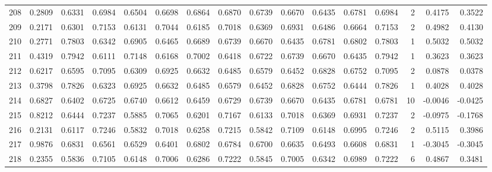 \begin{tabular}{lrrrrrrrrrrrrrrr}
208 &      0.2809 &  0.6331 &  0.6984 &  0.6504 &  0.6698 &  0.6864 &  0.6870 &  0.6739 &  0.6670 &  0.6435 &   0.6781 &     0.6984 &      2 &                    0.4175 &                     0.3522 \\
209 &      0.2171 &  0.6301 &  0.7153 &  0.6131 &  0.7044 &  0.6185 &  0.7018 &  0.6369 &  0.6931 &  0.6486 &   0.6664 &     0.7153 &      2 &                    0.4982 &                     0.4130 \\
210 &      0.2771 &  0.7803 &  0.6342 &  0.6905 &  0.6465 &  0.6689 &  0.6739 &  0.6670 &  0.6435 &  0.6781 &   0.6802 &     0.7803 &      1 &                    0.5032 &                     0.5032 \\
211 &      0.4319 &  0.7942 &  0.6111 &  0.7148 &  0.6168 &  0.7002 &  0.6418 &  0.6722 &  0.6739 &  0.6670 &   0.6435 &     0.7942 &      1 &                    0.3623 &                     0.3623 \\
212 &      0.6217 &  0.6595 &  0.7095 &  0.6309 &  0.6925 &  0.6632 &  0.6485 &  0.6579 &  0.6452 &  0.6828 &   0.6752 &     0.7095 &      2 &                    0.0878 &                     0.0378 \\
213 &      0.3798 &  0.7826 &  0.6323 &  0.6925 &  0.6632 &  0.6485 &  0.6579 &  0.6452 &  0.6828 &  0.6752 &   0.6444 &     0.7826 &      1 &                    0.4028 &                     0.4028 \\
214 &      0.6827 &  0.6402 &  0.6725 &  0.6740 &  0.6612 &  0.6459 &  0.6729 &  0.6739 &  0.6670 &  0.6435 &   0.6781 &     0.6781 &     10 &                   -0.0046 &                    -0.0425 \\
215 &      0.8212 &  0.6444 &  0.7237 &  0.5885 &  0.7065 &  0.6201 &  0.7167 &  0.6133 &  0.7018 &  0.6369 &   0.6931 &     0.7237 &      2 &                   -0.0975 &                    -0.1768 \\
216 &      0.2131 &  0.6117 &  0.7246 &  0.5832 &  0.7018 &  0.6258 &  0.7215 &  0.5842 &  0.7109 &  0.6148 &   0.6995 &     0.7246 &      2 &                    0.5115 &                     0.3986 \\
217 &      0.9876 &  0.6831 &  0.6561 &  0.6529 &  0.6401 &  0.6802 &  0.6784 &  0.6700 &  0.6635 &  0.6493 &   0.6608 &     0.6831 &      1 &                   -0.3045 &                    -0.3045 \\
218 &      0.2355 &  0.5836 &  0.7105 &  0.6148 &  0.7006 &  0.6286 &  0.7222 &  0.5845 &  0.7005 &  0.6342 &   0.6989 &     0.7222 &      6 &                    0.4867 &                     0.3481 \\

\end{tabular}
